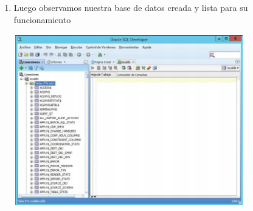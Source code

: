 \begin{enumerate}[1.]
	\hfill \break
	\hfill \break
	\hfill \break
	\hfill \break
	\hfill \break
	\hfill \break
	\hfill \break
	\item Luego observamos nuestra base de datos creada y lista para su funcionamiento\\
	\begin{center}
	\includegraphics[width=10cm]{./Imagenes/angela28} 
	\end{center}

	
	
\end{enumerate} 

